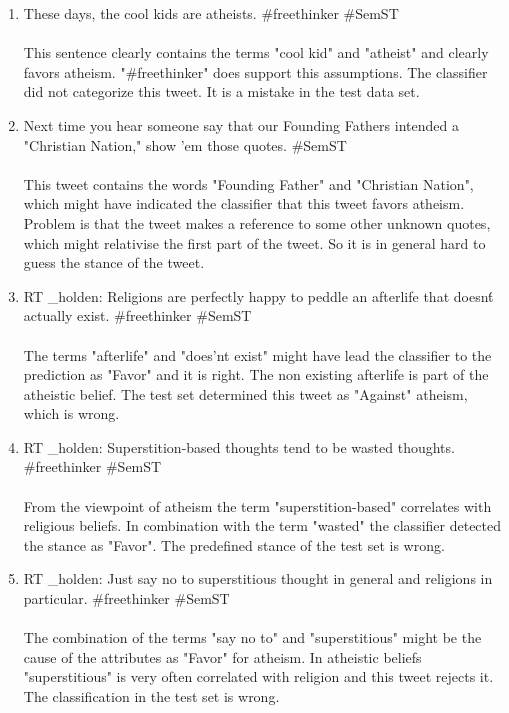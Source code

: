 \documentclass[a4paper,12pt,twoside]{article}
\begin{document}
\begin{enumerate}
\item These days, the cool kids are atheists.  \#freethinker \#SemST\\
\\
This sentence clearly contains the terms "cool kid" and "atheist" and clearly favors atheism. "\#freethinker" does support this assumptions. The classifier did not categorize this tweet. It is a mistake in the test data set.
\\
\item Next time you hear someone say that our Founding Fathers intended a "Christian Nation," show 'em those quotes. \#SemST\\
\\
This tweet contains the words "Founding Father" and "Christian Nation", which might have indicated the classifier that this tweet favors atheism. Problem is that the tweet makes a reference to some other unknown quotes, which might relativise the first part of the tweet. So it is in general hard to guess the stance of the tweet.
\\
\item RT \@br\_holden: Religions are perfectly happy to peddle an afterlife that doesn\'t actually exist.  \#freethinker \#SemST \\
\\
The terms "afterlife" and "does'nt exist" might have lead the classifier to the prediction as "Favor" and it is right. The non existing afterlife is part of the atheistic belief. The test set determined this tweet as "Against" atheism, which is wrong. 
\\
\item RT \@br\_holden: Superstition-based thoughts tend to be wasted thoughts.  \#freethinker \#SemST\\
\\
From the viewpoint of atheism the term "superstition-based" correlates with religious beliefs. In combination with the term "wasted" the classifier detected the stance as "Favor". The predefined stance of the test set is wrong. 
\\
\item RT \@br\_holden: Just say no to superstitious thought in general and religions in particular.  \#freethinker \#SemST\\
\\
The combination of the terms "say no to" and "superstitious" might be the cause of the attributes as "Favor" for atheism. In atheistic beliefs "superstitious" is very often correlated with religion and this tweet rejects it. The classification in the test set is wrong.  
\\
\end{enumerate}
\end{document}
